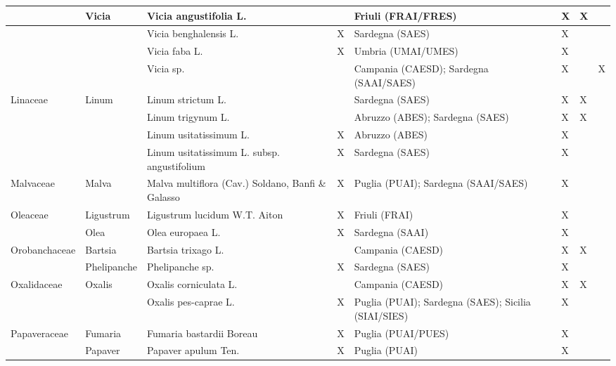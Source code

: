 \documentclass[main.tex]{subfiles}
\begin{document}
        \begin{table}[!ht]
        \centering
    \begin{tabular}[\footnotesize]{|p{2.2cm}|p{2.2cm}|p{2.2cm}|p{1.1cm}|p{1.6cm}|p{0.8cm}|p{1cm}|p{0.8cm}|}
    \hline
        ~ & Vicia & Vicia angustifolia L. & ~ & Friuli (FRAI/FRES) & X & X & ~ \\ \hline
        ~ & ~ & Vicia benghalensis L. & X & Sardegna (SAES) & X & ~ & ~ \\ \hline
        ~ & ~ & Vicia faba L. & X & Umbria (UMAI/UMES) & X & ~ & ~ \\ \hline
        ~ & ~ & Vicia sp. & ~ & Campania (CAESD); Sardegna (SAAI/SAES) & X & ~ & X \\ \hline
        Linaceae & Linum & Linum strictum L. & ~ & Sardegna (SAES) & X & X & ~ \\ \hline
        ~ & ~ & Linum trigynum L. & ~ & Abruzzo (ABES); Sardegna (SAES) & X & X & ~ \\ \hline
        ~ & ~ & Linum usitatissimum L. & X & Abruzzo (ABES) & X & ~ & ~ \\ \hline
        ~ & ~ & Linum usitatissimum L. subsp. angustifolium & X & Sardegna (SAES) & X & ~ & ~ \\ \hline
        Malvaceae & Malva & Malva multiflora (Cav.) Soldano, Banfi \& Galasso & X & Puglia (PUAI); Sardegna (SAAI/SAES) & X & ~ & ~ \\ \hline
        Oleaceae & Ligustrum & Ligustrum lucidum W.T. Aiton & X & Friuli (FRAI) & X & ~ & ~ \\ \hline
        ~ & Olea & Olea europaea L. & X & Sardegna (SAAI) & X & ~ & ~ \\ \hline
        Orobanchaceae & Bartsia & Bartsia trixago L. & ~ & Campania (CAESD) & X & X & ~ \\ \hline
        ~ & Phelipanche & Phelipanche sp. & X & Sardegna (SAES) & X & ~ & ~ \\ \hline
        Oxalidaceae & Oxalis & Oxalis corniculata L. & ~ & Campania (CAESD) & X & X & ~ \\ \hline
        ~ & ~ & Oxalis pes-caprae L. & X & Puglia (PUAI); Sardegna (SAES); Sicilia (SIAI/SIES) & X & ~ & ~ \\ \hline
        Papaveraceae & Fumaria & Fumaria bastardii Boreau & X & Puglia (PUAI/PUES) & X & ~ & ~ \\ \hline
        ~ & Papaver & Papaver apulum Ten. & X & Puglia (PUAI) & X & ~ & ~ \\ \hline
                    \end{tabular}
    \end{table}
    
\end{document}
